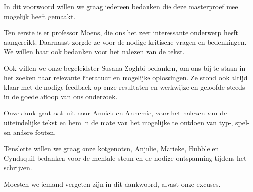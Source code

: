 \documentclass[master=cws,masteroption=ai]{kulemt}
\begin{document}
\begin{preface}
In dit voorwoord willen we graag iedereen bedanken die deze masterproef mee mogelijk heeft gemaakt.

Ten eerste is er professor Moens, die ons het zeer interessante onderwerp heeft aangereikt. Daarnaast zorgde ze voor de nodige kritische vragen en bedenkingen. We willen haar ook bedanken voor het nalezen van de tekst.

Ook willen we onze begeleidster Susana Zoghbi bedanken, om ons bij te staan in het zoeken naar relevante literatuur en mogelijke oplossingen. Ze stond ook altijd klaar met de nodige feedback op onze resultaten en werkwijze en geloofde steeds in de goede afloop van ons onderzoek.

Onze dank gaat ook uit naar Annick en Annemie, voor het nalezen van de uiteindelijke tekst en hem in de mate van het mogelijke te ontdoen van typ-, spel- en andere fouten. 

Tenslotte willen we graag onze kotgenoten, Anjulie, Marieke, Hubble en Cyndaquil bedanken voor de mentale steun en de nodige ontspanning tijdens het schrijven.

Moesten we iemand vergeten zijn in dit dankwoord, alvast onze excuses.

\end{preface}

\tableofcontents*
\end{document}
